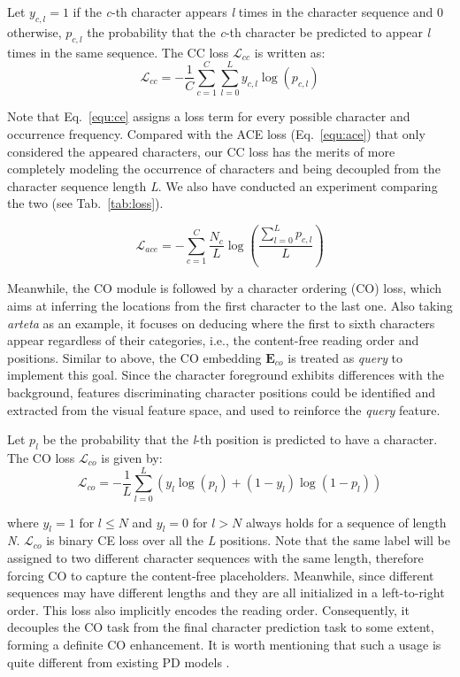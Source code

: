 \documentclass[10pt,journal,compsoc]{IEEEtran}
\begin{document}
Let $y_{c,l}=1$ if the \emph{c}-th character appears \emph{l} times in the character sequence and 0 otherwise, $p_{c,l}$ the probability that the \emph{c}-th character be predicted to appear \emph{l} times in the same sequence. The CC loss $\mathcal{L}_{cc}$ is written as:
\begin{equation}
\mathcal{L}_{cc} = -\frac{1}{C}\sum_{c=1}^C\sum_{l=0}^Ly_{c,l}\log(p_{c,l})
\label{equ:ce}
\end{equation}

Note that Eq.~\ref{equ:ce} assigns a loss term for every possible character and occurrence frequency. Compared with the ACE loss (Eq.~\ref{equ:ace}) \cite{xie2019aggregation} that only considered the appeared characters, our CC loss has the merits of more completely modeling the occurrence of characters and being decoupled from the character sequence length \emph{L}. We also have conducted an experiment comparing the two (see Tab.~\ref{tab:loss}).

\begin{equation}
\mathcal{L}_{ace} = -\sum_{c=1}^C \frac{N_{c}}{L}\log(\frac{\sum_{l=0}^Lp_{c,l}}{L})
\label{equ:ace}
\end{equation}


Meanwhile, the CO module is followed by a character ordering (CO) loss, which aims at inferring the locations from the first character to the last one. Also taking \emph{arteta} as an example, it focuses on deducing where the first to sixth characters appear regardless of their categories, i.e., the content-free reading order and positions. Similar to above, the CO embedding $\mathbf{E}_{co}$ is treated as \emph{query} to implement this goal. Since the character foreground exhibits differences with the background, features discriminating character positions could be identified and extracted from the visual feature space, and used to reinforce the \emph{query} feature.


Let $p_{l}$ be the probability that the \emph{l}-th position is predicted to have a character. The CO loss $\mathcal{L}_{co}$ is given by:
\begin{equation}
\mathcal{L}_{co} =  -\frac{1}{L}\sum_{l=0}^L{(y_{l}\log(p_{l}) + (1 - y_{l})\log(1 - p_{l}))}
\label{equ:bce}
\end{equation}

\noindent where $y_{l}=1$ for $l\leq N$ and $y_{l}=0$ for $l> N$ always holds for a sequence of length \emph{N}. $\mathcal{L}_{co}$ is binary CE loss over all the \emph{L} positions. Note that the same label will be assigned to two different character sequences with the same length, therefore forcing CO to capture the content-free placeholders. Meanwhile, since different sequences may have different lengths and they are all initialized in a left-to-right order. This loss also implicitly encodes the reading order. Consequently, it decouples the CO task from the final character prediction task to some extent, forming a definite CO enhancement. It is worth mentioning that such a usage is quite different from existing PD models \cite{yu2020srn,fang2021abinet,Wang_2021_visionlan}.
\end{document}
